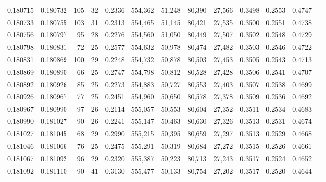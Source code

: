 \begin{tabular}{rrrrrrrrrrrrr}
0.180715 & 0.180732 & 105 &  32 &                                     0.2336 & 554,362 &  51,248 &  80,390 &  27,566 & 0.3498 & 0.2553 & 0.4747 \\
0.180733 & 0.180755 & 103 &  31 &                                     0.2313 & 554,465 &  51,145 &  80,421 &  27,535 & 0.3500 & 0.2551 & 0.4738 \\
0.180756 & 0.180797 &  95 &  28 &                                     0.2276 & 554,560 &  51,050 &  80,449 &  27,507 & 0.3502 & 0.2548 & 0.4729 \\
0.180798 & 0.180831 &  72 &  25 &                                     0.2577 & 554,632 &  50,978 &  80,474 &  27,482 & 0.3503 & 0.2546 & 0.4722 \\
0.180831 & 0.180869 & 100 &  29 &                                     0.2248 & 554,732 &  50,878 &  80,503 &  27,453 & 0.3505 & 0.2543 & 0.4713 \\
0.180869 & 0.180890 &  66 &  25 &                                     0.2747 & 554,798 &  50,812 &  80,528 &  27,428 & 0.3506 & 0.2541 & 0.4707 \\
0.180892 & 0.180926 &  85 &  25 &                                     0.2273 & 554,883 &  50,727 &  80,553 &  27,403 & 0.3507 & 0.2538 & 0.4699 \\
0.180926 & 0.180967 &  77 &  25 &                                     0.2451 & 554,960 &  50,650 &  80,578 &  27,378 & 0.3509 & 0.2536 & 0.4692 \\
0.180967 & 0.180990 &  97 &  26 &                                     0.2114 & 555,057 &  50,553 &  80,604 &  27,352 & 0.3511 & 0.2534 & 0.4683 \\
0.180990 & 0.181027 &  90 &  26 &                                     0.2241 & 555,147 &  50,463 &  80,630 &  27,326 & 0.3513 & 0.2531 & 0.4674 \\
0.181027 & 0.181045 &  68 &  29 &                                     0.2990 & 555,215 &  50,395 &  80,659 &  27,297 & 0.3513 & 0.2529 & 0.4668 \\
0.181046 & 0.181066 &  76 &  25 &                                     0.2475 & 555,291 &  50,319 &  80,684 &  27,272 & 0.3515 & 0.2526 & 0.4661 \\
0.181067 & 0.181092 &  96 &  29 &                                     0.2320 & 555,387 &  50,223 &  80,713 &  27,243 & 0.3517 & 0.2524 & 0.4652 \\
0.181092 & 0.181110 &  90 &  41 &                                     0.3130 & 555,477 &  50,133 &  80,754 &  27,202 & 0.3517 & 0.2520 & 0.4644 \\

\end{tabular}
